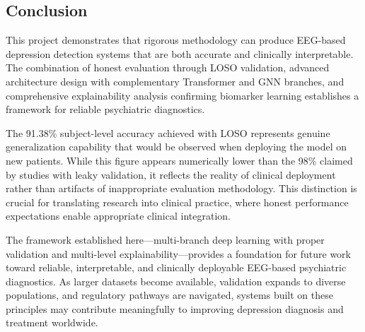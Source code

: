 \subsection{Conclusion}

This project demonstrates that rigorous methodology can produce EEG-based depression detection systems that are both accurate and clinically interpretable. The combination of honest evaluation through LOSO validation, advanced architecture design with complementary Transformer and GNN branches, and comprehensive explainability analysis confirming biomarker learning establishes a framework for reliable psychiatric diagnostics.

The 91.38\% subject-level accuracy achieved with LOSO represents genuine generalization capability that would be observed when deploying the model on new patients. While this figure appears numerically lower than the 98\% claimed by studies with leaky validation, it reflects the reality of clinical deployment rather than artifacts of inappropriate evaluation methodology. This distinction is crucial for translating research into clinical practice, where honest performance expectations enable appropriate clinical integration.

The framework established here---multi-branch deep learning with proper validation and multi-level explainability---provides a foundation for future work toward reliable, interpretable, and clinically deployable EEG-based psychiatric diagnostics. As larger datasets become available, validation expands to diverse populations, and regulatory pathways are navigated, systems built on these principles may contribute meaningfully to improving depression diagnosis and treatment worldwide.

